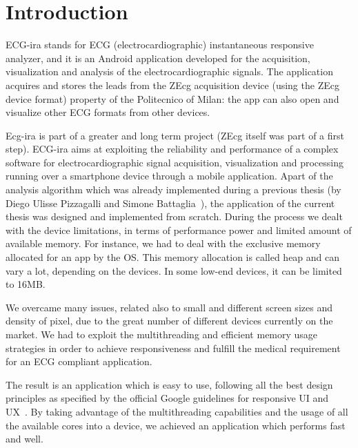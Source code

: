 
\chapter{Introduction}
\label{Chapter1} 

ECG-ira stands for ECG (electrocardiographic) instantaneous responsive analyzer, and it is an Android application developed for the acquisition, visualization and analysis of the electrocardiographic signals. The application acquires and stores the leads from the ZEcg acquisition device  (using the ZEcg device format) property of the Politecnico of Milan: the app can also open and visualize other ECG formats from other devices.

Ecg-ira is part of a greater and long term project (ZEcg itself was part of a first step). ECG-ira aims at exploiting the reliability and performance of a complex software for electrocardiographic signal acquisition, visualization  and processing running over a smartphone device through a mobile application. Apart of the analysis algorithm which was already implemented during a previous thesis (by Diego Ulisse Pizzagalli and Simone Battaglia~\cite{ref3}), the application of the current thesis was designed and implemented from scratch. During the process we dealt with the device limitations, in terms of performance power and limited amount of available memory. For instance, we had to deal with the exclusive memory allocated for an app by the OS. This memory allocation is called heap and can vary a lot, depending on the devices. In some low-end devices, it can be limited to 16MB.

We overcame many issues, related also to small and different screen sizes and density of pixel, due to the great number of different devices currently on the market. We had to exploit the multithreading and efficient memory usage strategies in order to achieve responsiveness and fulfill the medical requirement for an ECG compliant application.

The result is an application which is easy to use, following all the best design principles as specified by the official Google guidelines for responsive UI and UX~\cite{ref27}. By taking advantage of the multithreading capabilities and the usage of all the available cores into a device, we achieved an application which performs fast and well.

